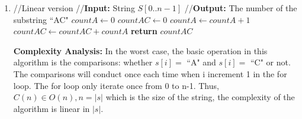 \documentclass[11pt]{article}
\begin{document}
\begin{enumerate}
\begin{enumerate}
\item %

\begin{algorithmic}[1]
	\State //Linear version
	\State //\textbf{Input:} String $S[0..n-1]$
	\State //\textbf{Output:} The number of the substring \textquotedblleft AC"
	\State $countA\gets 0$
	\State $countAC\gets 0$
			\State $countA\gets countA+1$
		\EndIf
			\State $countAC\gets countAC+countA$
		\EndIf
	\EndFor
	\State \textbf{return} $countAC$
\EndFunction
\end{algorithmic}
\textbf{Complexity Analysis:} In the worst case, 
the basic operation in this algorithm is the comparisons: 
whether $s[i] =$ \textquotedblleft A" and $s[i] =$ \textquotedblleft C" or not. 
The comparisons will conduct once each time when i increment 1 in the for loop. 
The for loop only iterate once from 0 to n-1. 
Thus, $C(n)\in O(n), n = |s|$ which is the size of the string, 
the complexity of the algorithm is linear in $|s|$.


\end{enumerate}
\end{enumerate}
\end{document}
